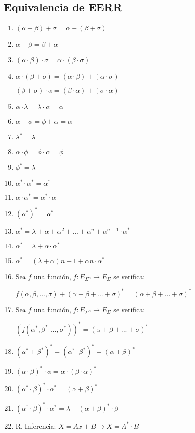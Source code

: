 \documentclass[12pt, twoside, openright]{report} %
\begin{document}
\subsection{Equivalencia de EERR}
\begin{multicols}{2}
	\begin{enumerate}
		\item $(\alpha+\beta)+\sigma = \alpha + (\beta + \sigma)$
		\item $\alpha + \beta = \beta + \alpha$
		\item $(\alpha \cdot \beta)\cdot\sigma = \alpha \cdot (\beta\cdot\sigma)$
		\item $\alpha \cdot (\beta +\sigma) = (\alpha \cdot \beta) + (\alpha \cdot \sigma)$

		      $(\beta +\sigma) \cdot \alpha  = (\beta \cdot \alpha) + (\sigma \cdot \alpha)$
		\item $\alpha \cdot \lambda = \lambda \cdot \alpha = \alpha$
		\item $\alpha + \phi = \phi + \alpha = \alpha$
		\item $\lambda^* = \lambda$
		\item $\alpha \cdot \phi = \phi \cdot \alpha= \phi$
		\item $\phi^* = \lambda$
		\item $\alpha^* \cdot \alpha^* = \alpha^*$
		\item $\alpha \cdot \alpha^* = \alpha^* \cdot \alpha$
		      \columnbreak
		\item $(\alpha^*)^*=\alpha^*$
		\item $\alpha^* = \lambda + \alpha + \alpha^2 + ... + \alpha^n + \alpha^{n+1} \cdot \alpha^*$
		\item $\alpha^* = \lambda + \alpha \cdot \alpha^*$
		\item $\alpha^* = (\lambda + \alpha)n-1 + \alpha n \cdot \alpha^*$
		\item Sea $f$ una función, $f: E_{\Sigma^n} \rightarrow E_\Sigma$ se verifica:

		      $f(\alpha, \beta, ..., \sigma) + (\alpha + \beta + ... + \sigma)^* = (\alpha + \beta + ... + \sigma)^*$
		\item Sea $f$ una función, $f: E_{\Sigma^n} \rightarrow E_\Sigma$ se verifica:

		      $(f(\alpha^*, \beta^*, ..., \sigma^*))^* = (\alpha + \beta + ... + \sigma)^*$
		\item $(\alpha^* + \beta^*)^* = (\alpha^* \cdot \beta^*)^* = (\alpha + \beta)^*$
		\item $(\alpha \cdot \beta)^*\cdot \alpha = \alpha \cdot (\beta \cdot \alpha)^*$
		\item $(\alpha^* \cdot \beta)^*\cdot \alpha^* =(\alpha + \beta)^*$
		\item $(\alpha^* \cdot \beta)^*\cdot \alpha^* = \lambda + (\alpha + \beta)^*\cdot \beta$
		\item R. Inferencia: $X=Ax + B \rightarrow X = A^* \cdot B$
	\end{enumerate}
\end{multicols}
\end{document}
